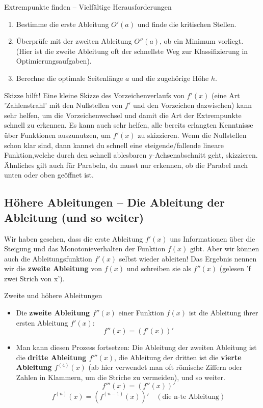 \begin{aufgabenumgebung}{Extrempunkte finden – Vielfältige Herausforderungen}
\begin{enumerate}
\begin{enumerate}[label=(\alph*)]
            \item Bestimme die erste Ableitung $O'(a)$ und finde die kritischen Stellen.
            \item Überprüfe mit der zweiten Ableitung $O''(a)$, ob ein Minimum vorliegt. (Hier ist die zweite Ableitung oft der schnellste Weg zur Klassifizierung in Optimierungsaufgaben).
            \item Berechne die optimale Seitenlänge $a$ und die zugehörige Höhe $h$.
        \end{enumerate}
\end{enumerate}
\end{aufgabenumgebung}


\begin{tippumgebung}{Skizze hilft!}
Eine kleine Skizze des Vorzeichenverlaufs von $f'(x)$ (eine Art 'Zahlenstrahl' mit den Nullstellen von $f'$ und den Vorzeichen dazwischen) kann sehr helfen, um die Vorzeichenwechsel und damit die Art der Extrempunkte schnell zu erkennen. Es kann auch sehr helfen, alle bereits erlangten Kenntnisse über Funktionen auszunutzen, um $f'(x)$ zu skizzieren. Wenn die Nullstellen schon klar sind, dann kannst du schnell eine steigende/fallende lineare Funktion,welche durch den schnell ablesbaren y-Achsenabschnitt geht, skizzieren. Ähnliches gilt auch für Parabeln, du musst nur erkennen, ob die Parabel nach unten oder oben geöffnet ist.  
\end{tippumgebung}

\subsection{Höhere Ableitungen – Die Ableitung der Ableitung (und so weiter)}
\label{subsec:hoehere_ableitungen}

Wir haben gesehen, dass die erste Ableitung $f'(x)$ uns Informationen über die Steigung und das Monotonieverhalten der Funktion $f(x)$ gibt. Aber wir können auch die Ableitungsfunktion $f'(x)$ selbst wieder ableiten! Das Ergebnis nennen wir die \textbf{zweite Ableitung} von $f(x)$ und schreiben sie als $f''(x)$ (gelesen 'f zwei Strich von x').

\begin{merksatzumgebung}{Zweite und höhere Ableitungen}
\begin{itemize}
    \item Die \textbf{zweite Ableitung $f''(x)$} einer Funktion $f(x)$ ist die Ableitung ihrer ersten Ableitung $f'(x)$:
    \[ f''(x) = (f'(x))' \]
    \item Man kann diesen Prozess fortsetzen: Die Ableitung der zweiten Ableitung ist die \textbf{dritte Ableitung $f'''(x)$}, die Ableitung der dritten ist die \textbf{vierte Ableitung $f^{(4)}(x)$} (ab hier verwendet man oft römische Ziffern oder Zahlen in Klammern, um die Striche zu vermeiden), und so weiter.
    \[ f'''(x) = (f''(x))' \]
    \[ f^{(n)}(x) = (f^{(n-1)}(x))' \quad (\text{die n-te Ableitung}) \]
\end{itemize}
\end{merksatzumgebung}

